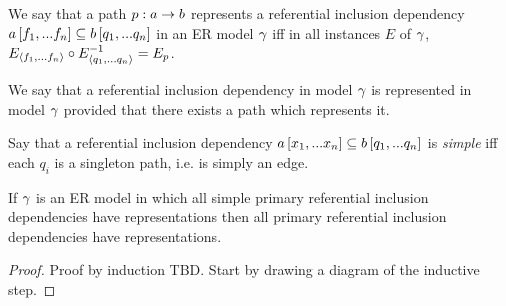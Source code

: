 \begin{definition}
We say that a path $p:a \rightarrow b$ represents a referential inclusion dependency
$a\left[f_1,...f_n\right]\subseteq b\left[q_1,...q_n\right]$  in an ER model $\gamma$ iff
  in all instances $E$ of $\gamma$, $E_{\langle f_1,...f_n\rangle} \circ E_{\langle q_1,...q_n\rangle}^{-1}=E_p$.
\end{definition}
We say that a referential inclusion dependency in model $\gamma$ is represented in model $\gamma$ provided that
there exists a path which represents it. 

\iffalse
\begin{categoricalaside}
If an ER schema is represented as a category with finite products (\textit{a la} Johnstone \textit{et al}) then
a referential inclusion dependency is a diagram
\begin{center}
$
\begin{array}{cp{0.75cm}c}
   \Rnode{a}{a}     & & \Rnode{x}{x}  \\[1.2cm]     
	                  & & \Rnode{b}{b}  
\end{array}
$
\ncarr{a}{x} 
\alabel{f}[0.33]
\ncarr{b}{x}
\blabel{m}[0.3]
\idcomp
\end{center}
\noindent
in \cat{C} such that in all instance functors $F$, 
$F(f)$ factors through $F(m)$.

Such a referential inclusion dependency is explicitly represented iff
 $f$ factors through $m$ i.e. there is an $f_0: a \morph b$ in \cat{C} such that 
$f_0 \circ m =f$. Note that because $m$ is monic then such an $f_0$ is the unique such morphism and if in some instance $F$,
$e: F(a) \morph F(b)$ is a function such that $e \circ F(m) = F(f)$ then $F(f_0)=e$. 
\end{categoricalaside}
\fi

\begin{definition}
Say that a referential inclusion dependency $a\left[x_1,...x_n\right]\subseteq b\left[q_1,...q_n\right]$ is \textit{simple}
iff each $q_i$ is a singleton path, i.e. is simply an edge. 
\end{definition}

\begin{lemma}
\label{simplerepresentationlemma}
If  $\gamma$ is an ER model in which all simple primary referential inclusion dependencies
have representations then all primary referential inclusion dependencies have representations. 
\end{lemma}
\begin{proof}
Proof by induction TBD. Start by drawing a diagram of the inductive step.
\end{proof}

